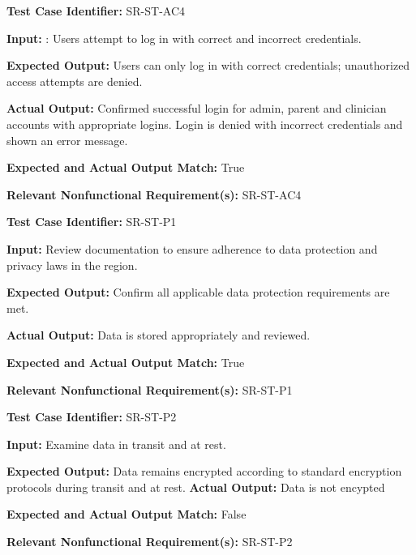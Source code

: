 \documentclass[12pt, titlepage]{article}
\begin{document}
\begin{mdframed}[linewidth=0.5mm] \par
  \textbf{Test Case Identifier:}  SR-ST-AC4 \par
  \textbf{Input:} : Users attempt to log in with correct and incorrect credentials. \par 
  \textbf{Expected Output:} Users can only log in with correct credentials; unauthorized
  access attempts are denied. \par
  \textbf{Actual Output:} Confirmed successful login for admin, parent and clinician accounts with appropriate logins. 
  Login is denied with incorrect credentials and shown an error message. \par
  \textbf{Expected and Actual Output Match:} True \par
  \textbf{Relevant Nonfunctional Requirement(s):} SR-ST-AC4
\end{mdframed}

\begin{mdframed}[linewidth=0.5mm] \par
  \textbf{Test Case Identifier:} SR-ST-P1 \par
  \textbf{Input:} Review documentation to ensure adherence to data protection
  and privacy laws in the region. \par 
  \textbf{Expected Output:} Confirm all applicable data protection requirements are met.
   \par
  \textbf{Actual Output:} Data is stored appropriately and reviewed. \par
  \textbf{Expected and Actual Output Match:} True \par
  \textbf{Relevant Nonfunctional Requirement(s):} SR-ST-P1
\end{mdframed}


\begin{mdframed}[linewidth=0.5mm] \par
  \textbf{Test Case Identifier:} SR-ST-P2 \par
  \textbf{Input:} Examine data in transit and at rest. \par 
  \textbf{Expected Output:} Data remains encrypted according to standard encryption
  protocols during transit and at rest.  
  \textbf{Actual Output:} Data is not encypted \par
  \textbf{Expected and Actual Output Match:} False \par
  \textbf{Relevant Nonfunctional Requirement(s):} SR-ST-P2 
\end{mdframed}
\end{document}

